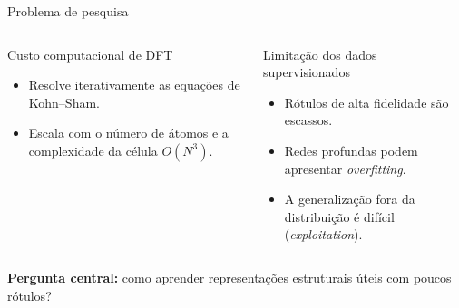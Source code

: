 \documentclass[aspectratio=169,10pt]{beamer}
\newcommand{\tightitem}{\setlength{\itemsep}{3pt}\setlength{\parskip}{0pt}}
\begin{document}
\begin{frame}{Problema de pesquisa}
\begin{columns}[T,onlytextwidth]
  \begin{block}{Custo computacional de DFT}
  \begin{itemize}\tightitem
    \item Resolve iterativamente as equações de Kohn--Sham.
    \item Escala com o número de átomos e a complexidade da célula $O(N^3)$.
  \end{itemize}
  \end{block}
  \begin{block}{Limitação dos dados supervisionados}
  \begin{itemize}\tightitem
    \item Rótulos de alta fidelidade são escassos.
    \item Redes profundas podem apresentar \textit{overfitting}.
    \item A generalização fora da distribuição é difícil (\textit{exploitation}).
  \end{itemize}
  \end{block}
\end{columns}
\vspace{4mm}
\centering
\textbf{Pergunta central:} como aprender representações estruturais úteis com poucos rótulos?
\end{frame}
\end{document}
